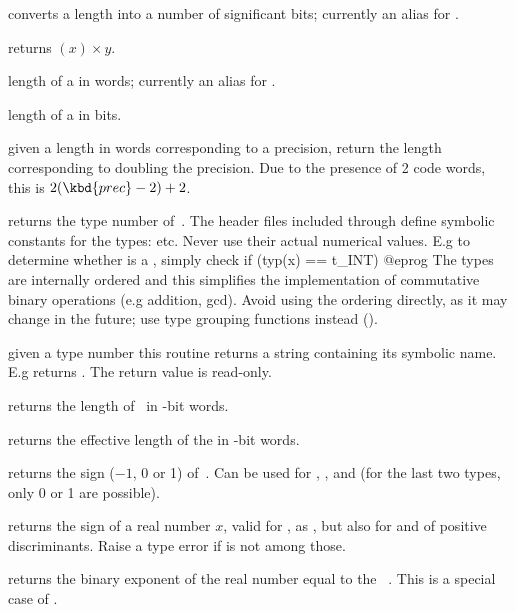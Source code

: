  converts a length into a number
of significant bits; currently an alias for .

 returns
$(x)\times y$.

 length of a  in words; currently an alias
for .

 length of a  in bits.

 given a length in words corresponding to a
 precision, return the length corresponding to doubling the
precision. Due to the presence of 2 code words, this is
 $2(\kbd{prec} - 2) + 2$.


 returns the type number of~. The header files
included through  define symbolic constants for the 
types:  etc. Never use their actual numerical values. E.g to determine
whether  is a , simply check
\bprog
  if (typ(x) == t_INT) { }
@eprog\noindent
The types are internally ordered and this simplifies the implementation of
commutative binary operations (e.g addition, gcd). Avoid using the ordering
directly, as it may change in the future; use type grouping functions
instead ().

 given a type number  this routine
returns a string containing its symbolic name. E.g 
returns . The return value is read-only.

 returns the length of~ in \B-bit words.

 returns the effective length of the 
 in \B-bit words.

 returns the sign ($-1$, 0 or 1) of~. Can be
used for , ,  and  (for the last two
types, only 0 or 1 are possible).

 returns the sign of a real number $x$,
valid for ,  as , but also for 
and  of positive discriminants. Raise a type error if 
is not among those.

 returns the binary exponent of the real number equal
to the ~. This is a special case of .

